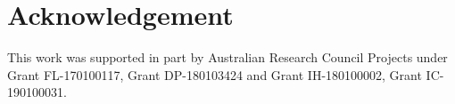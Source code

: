 \documentclass[final]{cvpr}
\begin{document}
\section*{Acknowledgement}
This work was supported in part by Australian Research Council Projects under Grant FL-170100117, Grant DP-180103424 and Grant IH-180100002, Grant IC-190100031.

{\small


}
\end{document}
